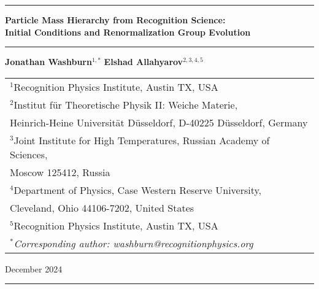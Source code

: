\documentclass[11pt,a4paper]{article}
\theoremstyle{definition}
\begin{document}
\begin{center}
    {\color{darkblue}\rule{\linewidth}{1pt}}
    \vspace{0.5cm}
    
    {\huge\bfseries\color{darkblue}
    Particle Mass Hierarchy from Recognition Science:\\
    Initial Conditions and Renormalization Group Evolution}
    
    \vspace{1cm}
    {\color{darkblue}\rule{0.5\linewidth}{0.5pt}}
    \vspace{0.8cm}
    
    {\Large
    \textbf{Jonathan Washburn}$^{1,\ast}$ \quad \textbf{Elshad Allahyarov}$^{2,3,4,5}$
    }
    
    \vspace{0.8cm}
    
    \begin{small}
    \begin{tabular}{l}
    $^1$Recognition Physics Institute, Austin TX, USA\\[3pt]
    $^2$Institut für Theoretische Physik II: Weiche Materie,\\
    \phantom{$^2$}Heinrich-Heine Universität Düsseldorf, D-40225 Düsseldorf, Germany\\[3pt]
    $^3$Joint Institute for High Temperatures, Russian Academy of Sciences,\\
    \phantom{$^3$}Moscow 125412, Russia\\[3pt]
    $^4$Department of Physics, Case Western Reserve University,\\
    \phantom{$^4$}Cleveland, Ohio 44106-7202, United States\\[3pt]
    $^5$Recognition Physics Institute, Austin TX, USA\\[6pt]
    $^\ast$\textit{Corresponding author: washburn@recognitionphysics.org}
    \end{tabular}
    \end{small}
    
    \vspace{0.8cm}
    {\color{gray}December 2024}
    \vspace{0.5cm}
    
    {\color{darkblue}\rule{\linewidth}{1pt}}
\end{center}

\vspace{1cm}
\end{document}
